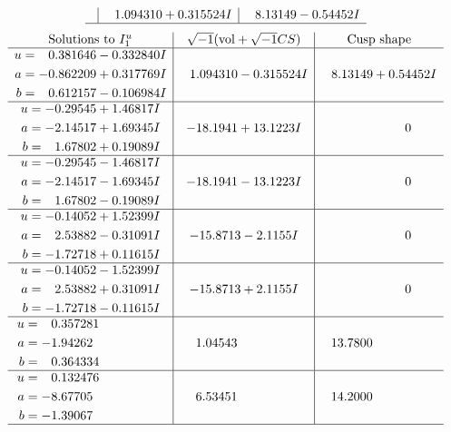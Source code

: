 \documentclass[1p]{elsarticle_modified}
\theoremstyle{definition}
\newcommand{\I}{\sqrt{-1}}
\begin{document}
$$\begin{array}{c|c|c}
 & \phantom{-}1.094310 + 0.315524 I & \phantom{-}8.13149 - 0.54452 I\\
 \hline 
 \end{array}$$\newpage$$\begin{array}{c|c|c}  
\text{Solutions to }I^u_{1}& \I (\text{vol} + \sqrt{-1}CS) & \text{Cusp shape}\\
 \hline 
\begin{aligned}
u &= \phantom{-}0.381646 - 0.332840 I \\
a &= -0.862209 + 0.317769 I \\
b &= \phantom{-}0.612157 - 0.106984 I\end{aligned}
 & \phantom{-}1.094310 - 0.315524 I & \phantom{-}8.13149 + 0.54452 I \\ \hline\begin{aligned}
u &= -0.29545 + 1.46817 I \\
a &= -2.14517 + 1.69345 I \\
b &= \phantom{-}1.67802 + 0.19089 I\end{aligned}
 & -18.1941 + 13.1223 I & \phantom{-0.000000 } 0 \\ \hline\begin{aligned}
u &= -0.29545 - 1.46817 I \\
a &= -2.14517 - 1.69345 I \\
b &= \phantom{-}1.67802 - 0.19089 I\end{aligned}
 & -18.1941 - 13.1223 I & \phantom{-0.000000 } 0 \\ \hline\begin{aligned}
u &= -0.14052 + 1.52399 I \\
a &= \phantom{-}2.53882 - 0.31091 I \\
b &= -1.72718 + 0.11615 I\end{aligned}
 & -15.8713 - 2.1155 I & \phantom{-0.000000 } 0 \\ \hline\begin{aligned}
u &= -0.14052 - 1.52399 I \\
a &= \phantom{-}2.53882 + 0.31091 I \\
b &= -1.72718 - 0.11615 I\end{aligned}
 & -15.8713 + 2.1155 I & \phantom{-0.000000 } 0 \\ \hline\begin{aligned}
u &= \phantom{-}0.357281\phantom{ +0.000000I} \\
a &= -1.94262\phantom{ +0.000000I} \\
b &= \phantom{-}0.364334\phantom{ +0.000000I}\end{aligned}
 & \phantom{-}1.04543\phantom{ +0.000000I} & \phantom{-}13.7800\phantom{ +0.000000I} \\ \hline\begin{aligned}
u &= \phantom{-}0.132476\phantom{ +0.000000I} \\
a &= -8.67705\phantom{ +0.000000I} \\
b &= -1.39067\phantom{ +0.000000I}\end{aligned}
 & \phantom{-}6.53451\phantom{ +0.000000I} & \phantom{-}14.2000\phantom{ +0.000000I}\\
 \hline 
 \end{array}$$\newpage\newpage\renewcommand{\arraystretch}{1}
\end{document}
